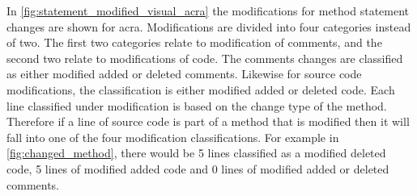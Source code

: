 In \autoref{fig:statement_modified_visual_acra} the modifications for method statement changes are shown for acra. Modifications are divided into four categories instead of two. The first two categories relate to modification of comments, and the second two relate to modifications of code. The comments changes are classified as either modified added or deleted comments. Likewise for source code modifications, the classification is either modified added or deleted code. Each line classified under modification is based on the change type of the method. Therefore if a line of source code is part of a method that is modified then it will fall into one of the four modification classifications. For example in \autoref{fig:changed_method}, there would be 5 lines classified as a modified deleted code, 5 lines of modified added code and 0 lines of modified added or deleted comments.





